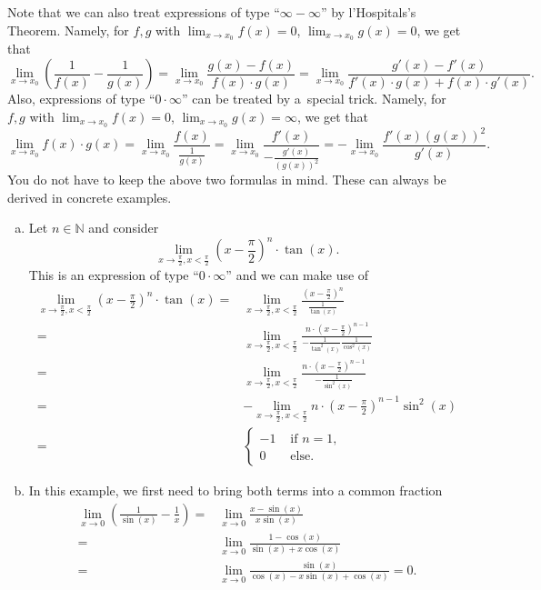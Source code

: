 Note that we can also treat expressions of type ``$\infty-\infty$'' by l'Hospitals's Theorem. Namely, for $f,g$ with $\lim_{x\to x_0}f(x)=0$,  $\lim_{x\to x_0}g(x)=0$, we get that
\[\lim_{x\to x_0}(\frac{1}{f(x)}-\frac{1}{g(x)})=\lim_{x\to x_0}\frac{g(x)-f(x)}{f(x)\cdot g(x)}=\lim_{x\to x_0}\frac{g'(x)-f'(x)}{f'(x)\cdot g(x)+f(x)\cdot g'(x)}.\]
Also, expressions of type ``$0\cdot\infty$'' can be treated by a~special trick. Namely, for $f,g$ with $\lim_{x\to x_0}f(x)=0$,  
$\lim_{x\to x_0}g(x)=\infty$, we get that
\[\lim_{x\to x_0}f(x)\cdot g(x)=\lim_{x\to x_0}\frac{f(x)}{\frac1{g(x)}}=\lim_{x\to x_0}\frac{f'(x)}{-\frac{g'(x)}{(g(x))^2}}=-\lim_{x\to x_0}\frac{f'(x) (g(x))^2}{g'(x)}.\]
You do not have to keep the above two formulas in mind. These can always be derived in concrete examples.
\begin{example}
\begin{enumerate}[a)]
\item Let $n\in\mathbb{N}$ and consider
\[\lim_{x\to\frac\pi2,x<\frac\pi2}\left(x-\frac\pi2\right)^n\cdot\tan(x).\]
This is an expression of type ``$0\cdot\infty$'' and we can make use of
\[
\begin{aligned}
\lim_{x\to\frac\pi2,x<\frac\pi2}\left(x-\frac\pi2\right)^n\cdot\tan(x)=&\lim_{x\to\frac\pi2,x<\frac\pi2}\frac{\left(x-\frac\pi2\right)^n}{\frac1{\tan(x)}}\\=&
\lim_{x\to\frac\pi2,x<\frac\pi2}\frac{n\cdot\left(x-\frac\pi2\right)^{n-1}}{-\frac1{\tan^2(x)}\frac1{\cos^2(x)}}\\=&
\lim_{x\to\frac\pi2,x<\frac\pi2}\frac{n\cdot\left(x-\frac\pi2\right)^{n-1}}{-\frac1{\sin^2(x)}}\\
=&-\lim_{x\to\frac\pi2,x<\frac\pi2}n\cdot\left(x-\frac\pi2\right)^{n-1}\sin^2(x)\\
=&\begin{cases}-1&\text{ if }n=1,\\0&\text{ else.}\end{cases}
\end{aligned}
\]
 \item In this example, we first need to bring both terms into a common fraction
\[
\begin{aligned}\lim_{x\to0}\left(\frac1{\sin(x)}-\frac1x\right)=&
\lim_{x\to0}\frac{x-\sin(x)}{x\sin(x)}\\=&
\lim_{x\to0}\frac{1-\cos(x)}{\sin(x)+x\cos(x)}\\=&
\lim_{x\to0}\frac{\sin(x)}{\cos(x)-x\sin(x)+\cos(x)}=0.
\end{aligned}
\]
\end{enumerate}
\end{example}

